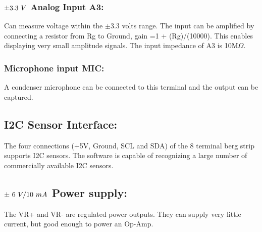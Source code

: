\documentclass[a4paper,12pt,english]{sphinxmanual}
\begin{document}
\subsubsection{\protect\(\pm3.3\ V\protect\) Analog Input A3:}
\label{\detokenize{1.2:pm3-3-v-analog-input-a3}}
Can measure voltage within the \(\pm\)3.3 volts range. The input can be
amplified by connecting a resistor from Rg to Ground, gain
=1 + (Rg)/(10000). This enables displaying very small amplitude signals.
The input impedance of A3 is 10M\(\Omega\).


\subsubsection{Microphone input MIC:}
\label{\detokenize{1.2:microphone-input-mic}}
A condenser microphone can be connected to this terminal and the output
can be captured.


\subsection{I2C Sensor Interface:}
\label{\detokenize{1.2:i2c-sensor-interface}}
The four connections (+5V, Ground, SCL and SDA) of the 8 terminal berg
strip supports I2C sensors. The software is capable of recognizing a
large number of commercially available I2C sensors.


\subsection{\protect\(\pm\ 6\ V/10\ mA\protect\) Power supply:}
\label{\detokenize{1.2:pm-6-v-10-ma-power-supply}}
The VR+ and VR- are regulated power outputs. They can supply very little
current, but good enough to power an Op-Amp.
\end{document}

